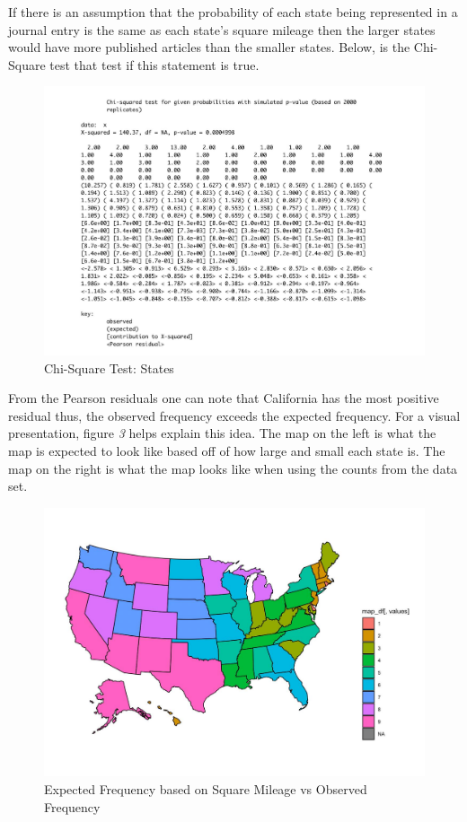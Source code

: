 \documentclass[
]{article}
\begin{document}
If there is an assumption that the probability of each state being
represented in a journal entry is the same as each state's square
mileage then the larger states would have more published articles than
the smaller states. Below, is the Chi-Square test that test if this
statement is true.

\begin{figure}
  \caption{Chi-Square Test: States}
    \includegraphics[width=13cm]{chi-state.pdf}
\end{figure}

From the Pearson residuals one can note that California has the most
positive residual thus, the observed frequency exceeds the expected
frequency. For a visual presentation, figure \emph{3} helps explain this
idea. The map on the left is what the map is expected to look like based
off of how large and small each state is. The map on the right is what
the map looks like when using the counts from the data set.

\begin{figure}
  \caption{Expected Frequency based on Square Mileage vs Observed Frequency}
    \includegraphics[width=13cm]{maps.pdf}
\end{figure}
\end{document}
